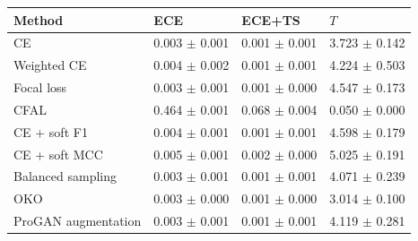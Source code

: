 \begin{tabular}{llll}
\toprule
Method & ECE & ECE+TS & $T$\\
\midrule
CE & \num{0.003} $\pm$ \num{0.001} & \num{0.001} $\pm$ \num{0.001} & \num{3.723} $\pm$ \num{0.142}\\
Weighted CE & \num{0.004} $\pm$ \num{0.002} & \num{0.001} $\pm$ \num{0.001} & \num{4.224} $\pm$ \num{0.503}\\
Focal loss & \num{0.003} $\pm$ \num{0.001} & \num{0.001} $\pm$ \num{0.000} & \num{4.547} $\pm$ \num{0.173}\\
CFAL & \num{0.464} $\pm$ \num{0.001} & \num{0.068} $\pm$ \num{0.004} & \num{0.050} $\pm$ \num{0.000}\\
CE + soft F1 & \num{0.004} $\pm$ \num{0.001} & \num{0.001} $\pm$ \num{0.001} & \num{4.598} $\pm$ \num{0.179}\\
CE + soft MCC & \num{0.005} $\pm$ \num{0.001} & \num{0.002} $\pm$ \num{0.000} & \num{5.025} $\pm$ \num{0.191}\\
Balanced sampling & \num{0.003} $\pm$ \num{0.001} & \num{0.001} $\pm$ \num{0.001} & \num{4.071} $\pm$ \num{0.239}\\
OKO & \num{0.003} $\pm$ \num{0.000} & \num{0.001} $\pm$ \num{0.000} & \num{3.014} $\pm$ \num{0.100}\\
ProGAN augmentation & \num{0.003} $\pm$ \num{0.001} & \num{0.001} $\pm$ \num{0.001} & \num{4.119} $\pm$ \num{0.281}\\
\bottomrule
\end{tabular}

